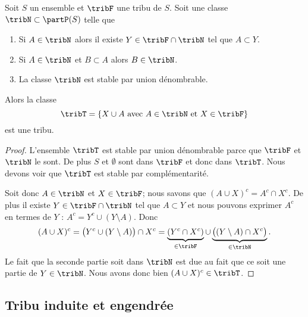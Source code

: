\begin{proposition}  \label{PropHYLooLgOCy}
	Soit \( S\) un ensemble et \( \tribF\) une tribu de \( S\). Soit une classe \( \tribN\subset\partP(S)\) telle que
	\begin{enumerate}
		\item
		      Si \( A\in\tribN\) alors il existe \( Y\in\tribF\cap\tribN\) tel que \( A\subset Y\).
		\item
		      Si \( A\in\tribN\) et \( B\subset A\) alors \( B\in\tribN\).
		\item
		      La classe \( \tribN\) est stable par union dénombrable.
	\end{enumerate}
	Alors la classe
	\begin{equation}
		\tribT=\{ X\cup A\text{ avec } A\in\tribN\text{ et } X\in\tribF \}
	\end{equation}
	est une tribu.
\end{proposition}

\begin{proof}
	L'ensemble \( \tribT\) est stable par union dénombrable parce que \( \tribF\) et \( \tribN\) le sont. De plus \( S\) et \( \emptyset\) sont dans \( \tribF\) et donc dans \( \tribT\). Nous devons voir que \( \tribT\) est stable par complémentarité.

	Soit donc \( A\in\tribN\) et \( X\in\tribF\); nous savons que \( (A\cup X)^c=A^c\cap X^c\). De plus il existe \( Y\in\tribF\cap\tribN\) tel que \( A\subset Y\) et nous pouvons exprimer \( A^c\) en termes de \( Y\) : \( A^c=Y^c\cup(Y\setminus A)\). Donc
	\begin{equation}
		(A\cup X)^c=\big( Y^c\cup(Y\setminus A) \big)\cap X^c=\underbrace{(Y^c\cap X^c)}_{\in\tribF}\cup\underbrace{\big( (Y\setminus A)\cap X^c \big)}_{\in\tribN}.
	\end{equation}
	Le fait que la seconde partie soit dans \( \tribN\) est due au fait que ce soit une partie de \( Y\in\tribN\). Nous avons donc bien \( (A\cup X)^c\in\tribT\).
\end{proof}

\subsection{Tribu induite et engendrée}

